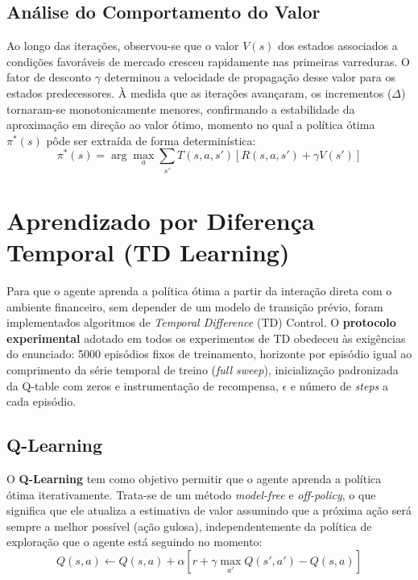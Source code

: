 \documentclass{article}
\begin{document}
\subsection{Análise do Comportamento do Valor}
Ao longo das iterações, observou-se que o valor $V(s)$ dos estados associados a condições favoráveis de mercado cresceu rapidamente nas primeiras varreduras. O fator de desconto $\gamma$ determinou a velocidade de propagação desse valor para os estados predecessores. À medida que as iterações avançaram, os incrementos ($\Delta$) tornaram-se monotonicamente menores, confirmando a estabilidade da aproximação em direção ao valor ótimo, momento no qual a política ótima $\pi^*(s)$ pôde ser extraída de forma determinística:
\begin{equation}
    \pi^*(s) = \arg\max_{a} \sum_{s'} T(s,a,s') \left[ R(s,a,s') + \gamma V(s') \right]
\end{equation}

\section{Aprendizado por Diferença Temporal (TD Learning)}
Para que o agente aprenda a política ótima a partir da interação direta com o ambiente financeiro, sem depender de um modelo de transição prévio, foram implementados algoritmos de \textit{Temporal Difference} (TD) Control. O \textbf{protocolo experimental} adotado em todos os experimentos de TD obedeceu às exigências do enunciado: 5000 episódios fixos de treinamento, horizonte por episódio igual ao comprimento da série temporal de treino (\textit{full sweep}), inicialização padronizada da Q-table com zeros e instrumentação de recompensa, $\epsilon$ e número de \textit{steps} a cada episódio.

\subsection{Q-Learning}
O \textbf{Q-Learning} tem como objetivo permitir que o agente aprenda a política ótima iterativamente. Trata-se de um método \textit{model-free} e \textit{off-policy}, o que significa que ele atualiza a estimativa de valor assumindo que a próxima ação será sempre a melhor possível (ação gulosa), independentemente da política de exploração que o agente está seguindo no momento:
\begin{equation}
    Q(s,a) \leftarrow Q(s,a) + \alpha \left[ r + \gamma \max_{a'} Q(s',a') - Q(s,a) \right]
\end{equation}
\end{document}
